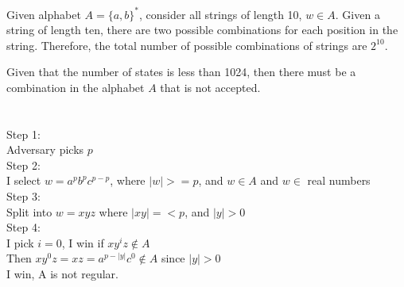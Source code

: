 \documentclass[10pt,letterpaper]{article}
\begin{document}
Given alphabet $A=\{a,b\}^*$, consider all strings of length 10, $w\in A$. Given
a string of length ten, there are two possible combinations for each position
in the string. Therefore, the total number of possible combinations of strings
are $2^{10}$.

Given that the number of states is less than 1024, then there must be a
combination in the alphabet $A$ that is not accepted. 

\section{}
Step 1:\\
Adversary picks $p$\\
Step 2:\\
I select $w=a^p b^p c^{p-p}$, where $|w|>=p$, and $w \in A$ and $w \in
$ real numbers\\
Step 3:\\
Split into $w=xyz$ where $|xy|=<p$, and $|y|>0$ \\
Step 4:\\
I pick $i=0$, I win if $xy^iz \notin A$\\
Then $xy^0z=xz=a^{p-|y|}c^0 \notin A$ since $|y|>0$\\
I win, A is not regular. 
\end{document}
